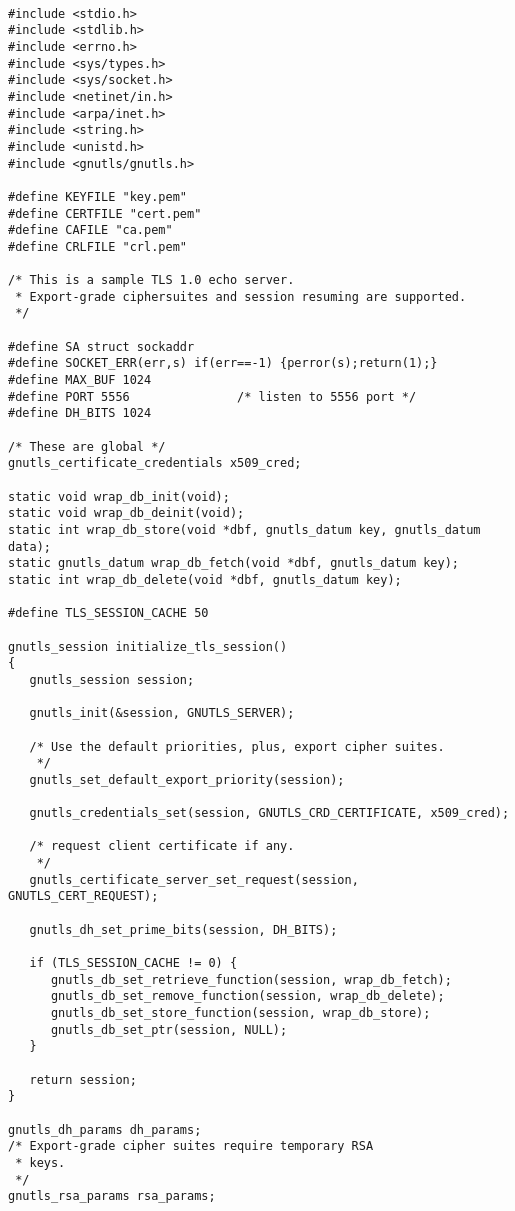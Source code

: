\begin{verbatim}

#include <stdio.h>
#include <stdlib.h>
#include <errno.h>
#include <sys/types.h>
#include <sys/socket.h>
#include <netinet/in.h>
#include <arpa/inet.h>
#include <string.h>
#include <unistd.h>
#include <gnutls/gnutls.h>

#define KEYFILE "key.pem"
#define CERTFILE "cert.pem"
#define CAFILE "ca.pem"
#define CRLFILE "crl.pem"

/* This is a sample TLS 1.0 echo server.
 * Export-grade ciphersuites and session resuming are supported.
 */

#define SA struct sockaddr
#define SOCKET_ERR(err,s) if(err==-1) {perror(s);return(1);}
#define MAX_BUF 1024
#define PORT 5556               /* listen to 5556 port */
#define DH_BITS 1024

/* These are global */
gnutls_certificate_credentials x509_cred;

static void wrap_db_init(void);
static void wrap_db_deinit(void);
static int wrap_db_store(void *dbf, gnutls_datum key, gnutls_datum data);
static gnutls_datum wrap_db_fetch(void *dbf, gnutls_datum key);
static int wrap_db_delete(void *dbf, gnutls_datum key);

#define TLS_SESSION_CACHE 50

gnutls_session initialize_tls_session()
{
   gnutls_session session;

   gnutls_init(&session, GNUTLS_SERVER);

   /* Use the default priorities, plus, export cipher suites.
    */
   gnutls_set_default_export_priority(session);

   gnutls_credentials_set(session, GNUTLS_CRD_CERTIFICATE, x509_cred);

   /* request client certificate if any.
    */
   gnutls_certificate_server_set_request(session, GNUTLS_CERT_REQUEST);

   gnutls_dh_set_prime_bits(session, DH_BITS);

   if (TLS_SESSION_CACHE != 0) {
      gnutls_db_set_retrieve_function(session, wrap_db_fetch);
      gnutls_db_set_remove_function(session, wrap_db_delete);
      gnutls_db_set_store_function(session, wrap_db_store);
      gnutls_db_set_ptr(session, NULL);
   }

   return session;
}

gnutls_dh_params dh_params;
/* Export-grade cipher suites require temporary RSA
 * keys.
 */
gnutls_rsa_params rsa_params;


\end{verbatim}
